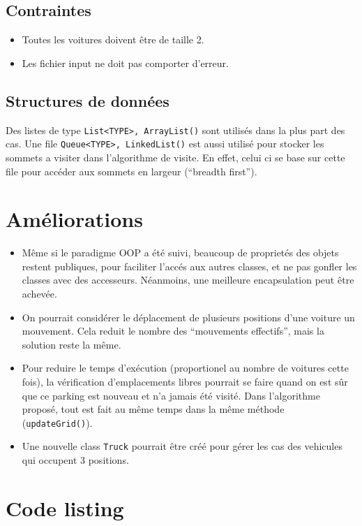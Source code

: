 \documentclass[11pt,a4paper]{article}
\begin{document}
\subsection{Contraintes}

\begin{itemize}
\item Toutes les voitures doivent être de taille 2.
\item Les fichier input ne doit pas comporter d'erreur.
\end{itemize}

\subsection{Structures de données}

Des listes de type \texttt{List<TYPE>, ArrayList()} sont utilisés dans
la plus part des cas. Une file \texttt{Queue<TYPE>, LinkedList()} est
aussi utilisé pour stocker les sommets a visiter dans l'algorithme de
visite. En effet, celui ci se base sur cette file pour accéder aux
sommets en largeur (``breadth first'').

\section{Améliorations}

\begin{itemize}
\item Même si le paradigme OOP a été suivi, beaucoup de proprietés des
  objets restent publiques, pour faciliter l'accés aux autres classes,
  et ne pas gonfler les classes avec des accesseurs. Néanmoins, une
  meilleure encapsulation peut être achevée.
\item On pourrait considérer le déplacement de plusieurs positions
  d'une voiture un mouvement. Cela reduit le nombre des ``mouvements
  effectifs'', mais la solution reste la même.
\item Pour reduire le temps d'exécution (proportionel au nombre de
  voitures cette fois), la vérification d'emplacements libres pourrait
  se faire quand on est sûr que ce parking est nouveau et n'a jamais
  été visité. Dans l'algorithme proposé, tout est fait au même temps
  dans la même méthode (\texttt{updateGrid()}).
\item Une nouvelle class \texttt{Truck} pourrait être créé pour gérer
  les cas des vehicules qui occupent 3 positions.

\end{itemize}


\newpage

\section{Code listing}


\newpage

\newpage

\newpage

\end{document}
